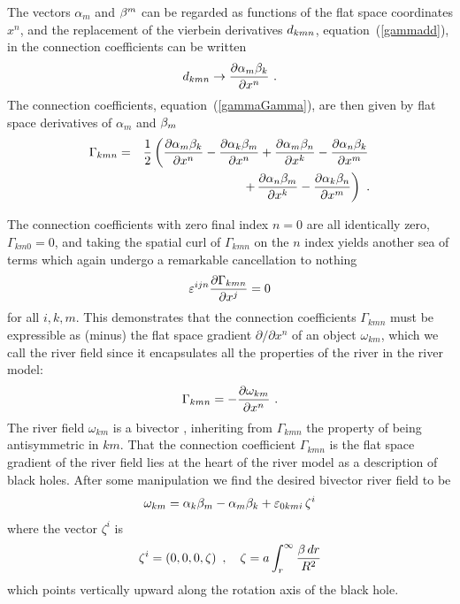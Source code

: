 \documentclass[twocolumn,showpacs,preprintnumbers,amsmath,amssymb,prb]{revtex4}
\begin{document}
The vectors $\alpha_m$ and $\beta^m$ can be regarded as functions
of the flat space coordinates $x^n$,
and the replacement of the vierbein derivatives $d_{kmn}$,
equation~(\ref{gammadd}),
in the connection coefficients
can be written
\begin{equation}
  d_{kmn} \rightarrow {\partial \alpha_m \beta_k \over \partial x^n}
  \ .
\end{equation}
The connection coefficients,
equation~(\ref{gammaGamma}),
are then given by flat space derivatives of $\alpha_m$ and $\beta_m$
\begin{eqnarray}
\label{gammaGammaav}
  \Gamma_{kmn}
  &=&
  \frac{1}{2}
  \left(
  {\partial \alpha_m \beta_k \over \partial x^n}
  -
  {\partial \alpha_k \beta_m \over \partial x^n}
  +
  {\partial \alpha_m \beta_n \over \partial x^k}
  -
  {\partial \alpha_n \beta_k \over \partial x^m}
  \right.
\nonumber
\\
  &&
  \left.
  + \,
  {\partial \alpha_n \beta_m \over \partial x^k}
  -
  {\partial \alpha_k \beta_n \over \partial x^m}
  \right)
  \ .
\end{eqnarray}

The connection coefficients with zero final index $n = 0$ are all
identically zero, $\Gamma_{km0} = 0$,
and taking the spatial curl of $\Gamma_{kmn}$ on the $n$ index
yields another sea of terms which again
undergo a remarkable cancellation
to nothing
\begin{equation}
\label{curlGamma}
  \varepsilon^{ijn} {\partial \Gamma_{kmn} \over \partial x^j}
  = 0
\end{equation}
for all $i,k,m$.
This demonstrates that the connection coefficients $\Gamma_{kmn}$
must be expressible as (minus) the flat space gradient $\partial / \partial x^n$
of an object $\omega_{km}$,
which we call the river field
since it encapsulates all the properties of the river
in the river model:
\begin{equation}
\label{gammaGammaomega}
  \Gamma_{kmn} = - {\partial \omega_{km} \over \partial x^n}
  \ .
\end{equation}
The river field $\omega_{km}$ is a bivector \cite{MTW,GLD},
inheriting from $\Gamma_{kmn}$ the property of being antisymmetric in $km$.
That the connection coefficient $\Gamma_{kmn}$ is the flat space gradient
of the river field lies at the heart of the river model
as a description of black holes.
After some manipulation we find the desired bivector river field to be
\begin{equation}
\label{omega}
  \omega_{km}
  =
  \alpha_k \beta_m - \alpha_m \beta_k + \varepsilon_{0kmi} \, \zeta^i
\end{equation}
where the vector $\zeta^i$ is
\begin{equation}
\label{zeta}
  \zeta^i = \left( 0 , 0 , 0 , \zeta \right)
  \ ,
  \quad
  \zeta = a \int_r^\infty {\beta\, dr \over R^2}
\end{equation}
which points vertically upward along the rotation axis of the black hole.
\end{document}
